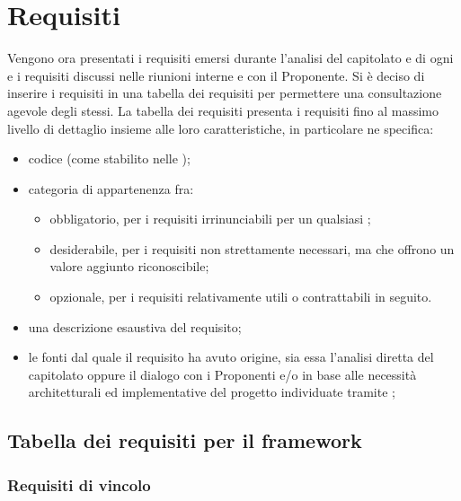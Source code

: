 \section{Requisiti}
Vengono ora presentati i requisiti emersi durante l'analisi del capitolato e di ogni  e i requisiti discussi nelle riunioni interne e con il Proponente.
Si è deciso di inserire i requisiti in una tabella dei requisiti per permettere una consultazione agevole degli stessi.
La tabella dei requisiti presenta i requisiti fino al massimo livello di dettaglio insieme alle loro caratteristiche, in particolare ne specifica:
\begin{itemize}
	\item codice (come stabilito nelle \NormeDiProgetto);
	\item categoria di appartenenza fra:
	\begin{itemize}
		\item obbligatorio, per i requisiti irrinunciabili per un qualsiasi ;
		\item desiderabile, per i requisiti non strettamente necessari, ma che offrono un valore aggiunto riconoscibile;
		\item opzionale, per i requisiti relativamente utili o contrattabili in seguito.
	\end{itemize}
	\item una descrizione esaustiva del requisito;
	\item le fonti dal quale il requisito ha avuto origine, sia essa l'analisi diretta del capitolato oppure il dialogo con i Proponenti e/o in base alle necessità architetturali ed implementative del progetto individuate tramite ;	
\end{itemize}

\subsection{Tabella dei requisiti per il framework \ProjectName}

\subsubsection{Requisiti di vincolo}

